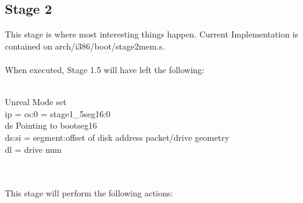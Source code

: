 \documentclass[11pt, letterpaper, twoside, english]{book}
\begin{document}
\subsection{Stage 2}
This stage is where most interesting things happen. Current Implementation is contained on \textsf{arch/i386/boot/stage2mem.s}.\\
\\
When executed, Stage 1.5 will have left the following:\\
\\
\begin{sf} 
\indent Unreal Mode set\\
\indent ip = cs:0 = stage1\_5seg16:0\\
\indent ds Pointing to bootseg16\\
\indent ds:si = segment:offset of disk address packet/drive geometry\\
\indent dl = drive num\\
\end{sf}\\
\\
This stage will perform the following actions:\\
\end{document}
